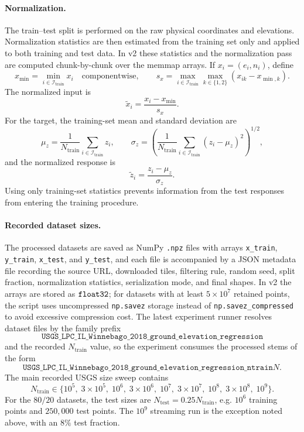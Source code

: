 \paragraph{Normalization.}
The train--test split is performed on the raw physical coordinates and
elevations.  Normalization statistics are then estimated from the training set
only and applied to both training and test data.  In v2 these statistics and
the normalization pass are computed chunk-by-chunk over the memmap arrays.  If
\(x_i=(e_i,n_i)\), define
\[
x_{\min}=\min_{i\in\mathcal{I}_{\mathrm{train}}} x_i
\quad\text{componentwise},
\qquad
s_x = \max_{i\in\mathcal{I}_{\mathrm{train}}}
\max_{k\in\{1,2\}} (x_{ik}-x_{\min,k}).
\]
The normalized input is
\[
\widetilde{x}_i = \frac{x_i-x_{\min}}{s_x}.
\]
For the target, the training-set mean and standard deviation are
\[
\mu_z=\frac{1}{N_{\mathrm{train}}}
\sum_{i\in\mathcal{I}_{\mathrm{train}}} z_i,
\qquad
\sigma_z =
\left(
\frac{1}{N_{\mathrm{train}}}
\sum_{i\in\mathcal{I}_{\mathrm{train}}}(z_i-\mu_z)^2
\right)^{1/2},
\]
and the normalized response is
\[
\widetilde{z}_i=\frac{z_i-\mu_z}{\sigma_z}.
\]
Using only training-set statistics prevents information from the test responses
from entering the training procedure.

\paragraph{Recorded dataset sizes.}
The processed datasets are saved as NumPy \texttt{.npz} files with arrays
\texttt{x\_train}, \texttt{y\_train}, \texttt{x\_test}, and \texttt{y\_test},
and each file is accompanied by a JSON metadata file recording the source URL,
downloaded tiles, filtering rule, random seed, split fraction, normalization
statistics, serialization mode, and final shapes.  In v2 the arrays are stored
as \(\text{\texttt{float32}}\); for datasets with at least \(5\times 10^7\) retained
points, the script uses uncompressed \texttt{np.savez} storage instead of
\texttt{np.savez\_compressed} to avoid excessive compression cost.  The latest
experiment runner resolves dataset files by the family prefix
\[
\texttt{USGS\_LPC\_IL\_Winnebago\_2018\_ground\_elevation\_regression}
\]
and the recorded \(N_{\mathrm{train}}\) value, so the experiment consumes the
processed stems of the form
\[
\texttt{USGS\_LPC\_IL\_Winnebago\_2018\_ground\_elevation\_regression\_ntrain}N.
\]
The main recorded USGS size sweep contains
\[
N_{\mathrm{train}}
\in
\{10^5,\;3\times10^5,\;10^6,\;3\times10^6,\;10^7,\;3\times10^7,\;
10^8,\;3\times10^8,\;10^9\}.
\]
For the \(80/20\) datasets, the test sizes are \(N_{\mathrm{test}}
=0.25N_{\mathrm{train}}\), e.g. \(10^6\) training points and \(250{,}000\)
test points.  The \(10^9\) streaming run is the exception noted above, with an
\(8\%\) test fraction.
